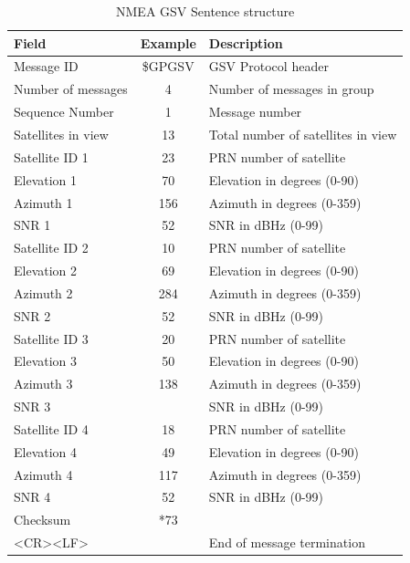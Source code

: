 \renewcommand{\arraystretch}{1.2}
\begin{table}[H]
    \begin{center}
        \caption{NMEA GSV Sentence structure}
        \label{tab:NMEA GSV Struct}
        \begin{tabular}{ |m{4cm}|c|p{6cm}| }
            \hline
            \textbf{Field} & \textbf{Example} & \textbf{Description} \\
            \hline
            Message ID & \$GPGSV & GSV Protocol header \\
            \hline
            Number of messages & 4 & Number of messages in group \\
            \hline
            Sequence Number & 1 & Message number \\
            \hline
            Satellites in view & 13 & Total number of satellites in view\\
            \hline
            Satellite ID 1 & 23 & PRN number of satellite \\
            \hline
            Elevation 1 & 70 & Elevation in degrees (0-90)\\
            \hline
            Azimuth 1 & 156 & Azimuth in degrees (0-359)\\
            \hline
            SNR 1 & 52 & SNR in dBHz (0-99)\\
            \hline
            Satellite ID 2 & 10 & PRN number of satellite \\
            \hline
            Elevation 2 & 69 & Elevation in degrees (0-90)\\
            \hline
            Azimuth 2 & 284 & Azimuth in degrees (0-359)\\
            \hline
            SNR 2 & 52 & SNR in dBHz (0-99)\\
            \hline
            Satellite ID 3 & 20 & PRN number of satellite \\
            \hline
            Elevation 3 & 50 & Elevation in degrees (0-90)\\
            \hline
            Azimuth 3 & 138 & Azimuth in degrees (0-359)\\
            \hline
            SNR 3 &  & SNR in dBHz (0-99)\\
            \hline
            Satellite ID 4 & 18 & PRN number of satellite \\
            \hline
            Elevation 4 & 49 & Elevation in degrees (0-90)\\
            \hline
            Azimuth 4 & 117 & Azimuth in degrees (0-359)\\
            \hline
            SNR 4 & 52 & SNR in dBHz (0-99)\\
            \hline
            Checksum & *73 &  \\
            \hline
            <CR><LF> & & End of message termination \\
            \hline
        \end{tabular}
    \end{center}
\end{table}
\renewcommand{\arraystretch}{1}

